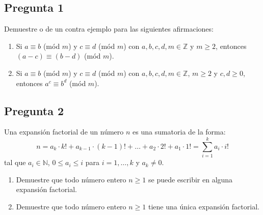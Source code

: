 \documentclass[letter]{article}
\begin{document}
	
	\begin{pregunta}{1} %
		\section*{Pregunta 1}
		Demuestre o de un contra ejemplo para las siguientes afirmaciones:
		\begin{enumerate}
		\item Si $a\equiv b$ (mód $m$) y $c\equiv d$ (mód $m$) con $a,b,c,d,m \in \mathbb{Z}$ y $m\geq 2$, entonces $(a-c)\equiv (b-d)$ (mód $m$).
		\item Si $a\equiv b$ (mód $m$) y $c\equiv d$ (mód $m$) con $a,b,c,d,m\in \mathbb{Z}$, $m\geq 2$ y $c,d\geq 0$, entonces $a^{c}\equiv b^{d}$ (mód $m$).
		\end{enumerate}
		
	\end{pregunta}
	
	\begin{pregunta}{2}
		\section*{Pregunta 2}
		Una expansión factorial de un número $n$ es una sumatoria de la forma:
		$$ n = a_{k}\cdot k!+ a_{k-1}\cdot (k-1)!+\ldots + a_{2}\cdot 2!+a_{1}\cdot 1! = \sum_{i=1}^{k}a_{i}\cdot i!$$
		tal que $a_{i} \in \mathbb{N}$, $0\leq a_{i}\leq i$ para $i = 1, \ldots, k$ y $a_{k}\neq 0$.
		\begin{enumerate}
		\item Demuestre que todo número entero $n\geq 1$ se puede escribir en alguna expansión factorial.
		\item Demuestre que todo número entero $n\geq 1$ tiene una única expansión factorial.
		\end{enumerate}
		
	\end{pregunta}
\end{document}
